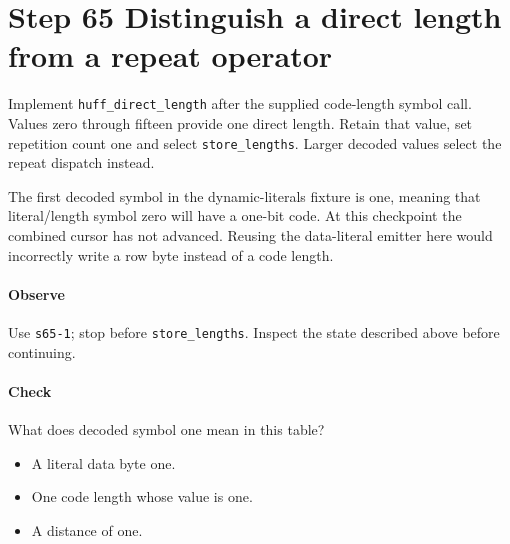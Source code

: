 \section{Step 65 Distinguish a direct length from a repeat operator}\label{png-huff-s65}
Implement \texttt{huff\_direct\_length} after the supplied code-length symbol call. Values zero through fifteen provide one direct length. Retain that value, set repetition count one and select \texttt{store\_lengths}. Larger decoded values select the repeat dispatch instead.

The first decoded symbol in the dynamic-literals fixture is one, meaning that literal/length symbol zero will have a one-bit code. At this checkpoint the combined cursor has not advanced. Reusing the data-literal emitter here would incorrectly write a row byte instead of a code length.

\paragraph{Observe} Use \texttt{s65-1}; stop before \texttt{store\_lengths}. Inspect the state described above before continuing.

\paragraph{Check} What does decoded symbol one mean in this table?
\begin{itemize}
  \item[A.] A literal data byte one.
  \item[B.] One code length whose value is one.
  \item[C.] A distance of one.
\end{itemize}
